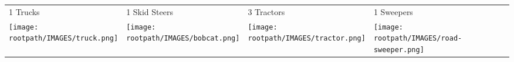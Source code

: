 \begin{tabular}{m{}m{}m{}m{}}
    {\color{ccorange} 1 Trucks} & {\color{ccorange} 1 Skid Steers} & {\color{ccorange} 3 Tractors} & {\color{ccorange} 1 Sweepers} \\
    \texttt{[image: \\rootpath/IMAGES/truck.png]}  & \texttt{[image: \\rootpath/IMAGES/bobcat.png]} & \texttt{[image: \\rootpath/IMAGES/tractor.png]} & \texttt{[image: \\rootpath/IMAGES/road-sweeper.png]}                         
    \end{tabular}